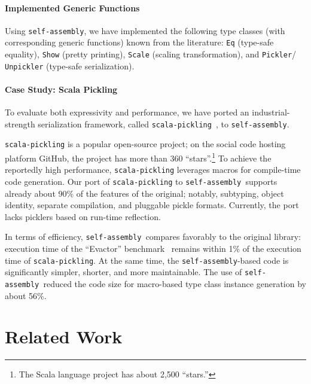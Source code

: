 \documentclass[preprint,nocopyrightspace]{sigplanconf}
\newcommand{\selfassembly}{\texttt{self-assembly~}}
\newcommand{\sselfassembly}{\texttt{self-assembly}}
\begin{document}
\paragraph{Implemented Generic Functions}

Using \sselfassembly, we have implemented the following type classes (with
corresponding generic functions) known from the literature: \verb|Eq|
(type-safe equality), \verb|Show| (pretty printing), \verb|Scale| (scaling
transformation), and \verb|Pickler|/\\\verb|Unpickler| (type-safe serialization).

\paragraph{Case Study: Scala Pickling}

To evaluate both expressivity and performance, we have ported an
industrial-strength serialization framework, called \verb|scala-pickling|~\cite{Pickling}, to \sselfassembly.

\verb|scala-pickling| is a popular open-source project; on the social code
hosting platform GitHub, the project has more than 360 ``stars''.\footnote{The
Scala language project has about 2,500 ``stars.''} To achieve the reportedly
high performance, \verb|scala-pickling| leverages macros for compile-time code
generation. Our port of \verb|scala-pickling| to \selfassembly supports
already about 90\% of the features of the original; notably, subtyping, object
identity, separate compilation, and pluggable pickle formats. Currently, the
port lacks picklers based on run-time reflection.

In terms of efficiency,  \selfassembly compares favorably to the original
library: execution time of the ``Evactor'' benchmark~\cite{Pickling} remains
within 1\% of the execution time of \verb|scala-pickling|. At the same time,
the \sselfassembly-based code is significantly simpler, shorter, and more
maintainable. The use of \selfassembly reduced the code size for macro-based
type class instance generation by about 56\%.



\section{Related Work}
\label{sec:related-work}
\end{document}
